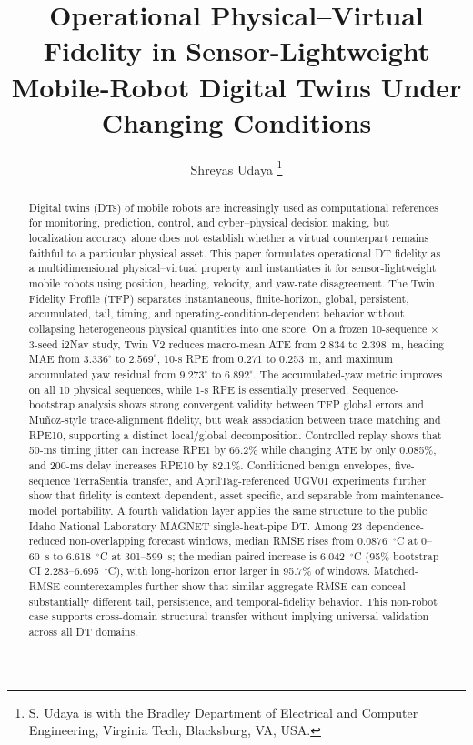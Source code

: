\documentclass[journal]{IEEEtran}
\title{Operational Physical--Virtual Fidelity in Sensor-Lightweight Mobile-Robot Digital Twins Under Changing Conditions}
\author{Shreyas Udaya%
\thanks{S. Udaya is with the Bradley Department of Electrical and Computer Engineering, Virginia Tech, Blacksburg, VA, USA.}%
}
\begin{document}
\maketitle

\begin{abstract}
Digital twins (DTs) of mobile robots are increasingly used as computational references for monitoring, prediction, control, and cyber--physical decision making, but localization accuracy alone does not establish whether a virtual counterpart remains faithful to a particular physical asset. This paper formulates operational DT fidelity as a multidimensional physical--virtual property and instantiates it for sensor-lightweight mobile robots using position, heading, velocity, and yaw-rate disagreement. The Twin Fidelity Profile (TFP) separates instantaneous, finite-horizon, global, persistent, accumulated, tail, timing, and operating-condition-dependent behavior without collapsing heterogeneous physical quantities into one score. On a frozen 10-sequence $\times$ 3-seed i2Nav study, Twin V2 reduces macro-mean ATE from 2.834 to 2.398~m, heading MAE from $3.336^{\circ}$ to $2.569^{\circ}$, 10-s RPE from 0.271 to 0.253~m, and maximum accumulated yaw residual from $9.273^{\circ}$ to $6.892^{\circ}$. The accumulated-yaw metric improves on all 10 physical sequences, while 1-s RPE is essentially preserved. Sequence-bootstrap analysis shows strong convergent validity between TFP global errors and Mu\~noz-style trace-alignment fidelity, but weak association between trace matching and RPE10, supporting a distinct local/global decomposition. Controlled replay shows that 50-ms timing jitter can increase RPE1 by 66.2\% while changing ATE by only 0.085\%, and 200-ms delay increases RPE10 by 82.1\%. Conditioned benign envelopes, five-sequence TerraSentia transfer, and AprilTag-referenced UGV01 experiments further show that fidelity is context dependent, asset specific, and separable from maintenance-model portability. A fourth validation layer applies the same structure to the public Idaho National Laboratory MAGNET single-heat-pipe DT. Among 23 dependence-reduced non-overlapping forecast windows, median RMSE rises from 0.0876~$^{\circ}$C at 0--60~s to 6.618~$^{\circ}$C at 301--599~s; the median paired increase is 6.042~$^{\circ}$C (95\% bootstrap CI 2.283--6.695~$^{\circ}$C), with long-horizon error larger in 95.7\% of windows. Matched-RMSE counterexamples further show that similar aggregate RMSE can conceal substantially different tail, persistence, and temporal-fidelity behavior. This non-robot case supports cross-domain structural transfer without implying universal validation across all DT domains.
\end{abstract}
\end{document}
